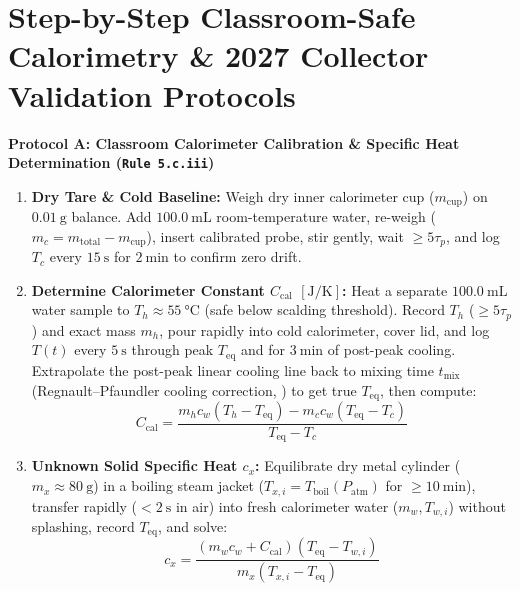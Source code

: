 \section{Step-by-Step Classroom-Safe Calorimetry \& 2027 Collector Validation Protocols}\label{sec:17.7}

\begin{devicebox}
\begin{twocol}[0.485]
\textbf{Protocol A: Classroom Calorimeter Calibration \& Specific Heat Determination (\texttt{Rule 5.c.iii})}
\begin{enumerate}
  \item \textbf{Dry Tare \& Cold Baseline:} Weigh dry inner calorimeter cup ($m_{\mathrm{cup}}$) on $\SI{0.01}{\gram}$ balance. Add $\SI{100.0}{\milli\liter}$ room-temperature water, re-weigh ($m_c = m_{\mathrm{total}} - m_{\mathrm{cup}}$), insert calibrated probe, stir gently, wait $\ge 5\tau_p$, and log $T_c$ every $\SI{15}{\second}$ for $\SI{2}{\minute}$ to confirm zero drift.
  \item \textbf{Determine Calorimeter Constant $C_{\mathrm{cal}}$ $[\si{\joule\per\kelvin}]$:} Heat a separate $\SI{100.0}{\milli\liter}$ water sample to $T_h \approx \SI{55}{\celsius}$ (safe below scalding threshold). Record $T_h$ ($\ge 5\tau_p$) and exact mass $m_h$, pour rapidly into cold calorimeter, cover lid, and log $T(t)$ every $\SI{5}{\second}$ through peak $T_{\mathrm{eq}}$ and for $\SI{3}{\minute}$ of post-peak cooling. Extrapolate the post-peak linear cooling line back to mixing time $t_{\mathrm{mix}}$ (Regnault--Pfaundler cooling correction, ) to get true $T_{\mathrm{eq}}$, then compute:
  $$C_{\mathrm{cal}} = \frac{m_h c_w (T_h - T_{\mathrm{eq}}) - m_c c_w (T_{\mathrm{eq}} - T_c)}{T_{\mathrm{eq}} - T_c}$$
  \item \textbf{Unknown Solid Specific Heat $c_x$:} Equilibrate dry metal cylinder ($m_x \approx \SI{80}{\gram}$) in a boiling steam jacket ($T_{x,i} = T_{\mathrm{boil}}(P_{\mathrm{atm}})$ for $\ge\SI{10}{\minute}$), transfer rapidly ($<\SI{2}{\second}$ in air) into fresh calorimeter water ($m_w, T_{w,i}$) without splashing, record $T_{\mathrm{eq}}$, and solve:
  $$c_x = \frac{\left(m_w c_w + C_{\mathrm{cal}}\right)(T_{\mathrm{eq}} - T_{w,i})}{m_x\left(T_{x,i} - T_{\mathrm{eq}}\right)}$$

\end{enumerate}
\end{twocol}
\end{devicebox}
